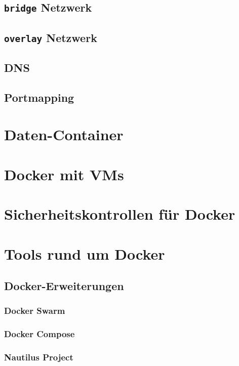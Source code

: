\documentclass[../main.tex]{subfiles}
\begin{document}
		\subsection{\texttt{bridge} Netzwerk}
		\subsection{\texttt{overlay} Netzwerk}
		\subsection{DNS}
		\subsection{Portmapping}
	\section{Daten-Container}
	\section{Docker mit \acrshort{VM}s}
  \section{Sicherheitskontrollen für Docker}
	\section{Tools rund um Docker}

    \subsection{Docker-Erweiterungen}
      \subsubsection{Docker Swarm}
      \subsubsection{Docker Compose}
      \subsubsection{Nautilus Project}
\end{document}
